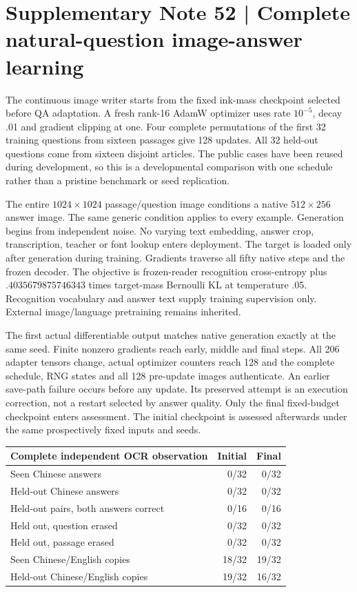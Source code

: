 \clearpage
\section*{Supplementary Note 52 | Complete natural-question image-answer learning}
\label{note:native-qa-learning}
The continuous image writer starts from the fixed ink-mass checkpoint selected
before QA adaptation. A fresh rank-16 AdamW optimizer uses rate $10^{-5}$,
decay .01 and gradient clipping at one. Four complete permutations of the
first 32 training questions from sixteen passages give 128 updates. All 32
held-out questions come from sixteen disjoint articles. The public cases have
been reused during development, so this is a developmental comparison with
one schedule rather than a pristine benchmark or seed replication.

The entire $1024\times1024$ passage/question image conditions a native
$512\times256$ answer image. The same generic condition applies to every
example. Generation begins from independent noise. No varying text embedding,
answer crop, transcription, teacher or font lookup enters deployment. The
target is loaded only after generation during training. Gradients traverse
all fifty native steps and the frozen decoder. The objective is frozen-reader
recognition cross-entropy plus $.4035679875746343$ times target-mass Bernoulli
KL at temperature .05. Recognition vocabulary and answer text supply training
supervision only. External image/language pretraining remains inherited.

The first actual differentiable output matches native generation exactly at
the same seed. Finite nonzero gradients reach early, middle and final steps.
All 206 adapter tensors change, actual optimizer counters reach 128 and the
complete schedule, RNG states and all 128 pre-update images authenticate.
An earlier save-path failure occurs before any update. Its preserved attempt
is an execution correction, not a restart selected by answer quality. Only
the final fixed-budget checkpoint enters assessment. The initial checkpoint
is assessed afterwards under the same prospectively fixed inputs and seeds.

\begin{center}\small
\begin{tabular}{lrr}
\toprule
Complete independent OCR observation & Initial & Final\\
\midrule
Seen Chinese answers & 0/32 & 0/32\\
Held-out Chinese answers & 0/32 & 0/32\\
Held-out pairs, both answers correct & 0/16 & 0/16\\
Held out, question erased & 0/32 & 0/32\\
Held out, passage erased & 0/32 & 0/32\\
Seen Chinese/English copies & 18/32 & 19/32\\
Held-out Chinese/English copies & 19/32 & 16/32\\
\bottomrule
\end{tabular}
\end{center}

